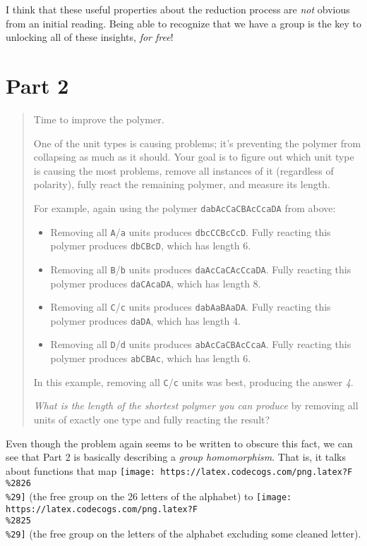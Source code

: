 \documentclass[]{article}
\begin{document}
I think that these useful properties about the reduction process are \emph{not}
obvious from an initial reading. Being able to recognize that we have a group is
the key to unlocking all of these insights, \emph{for free}!

\hypertarget{part-2}{%
\section{Part 2}\label{part-2}}

\begin{quote}
Time to improve the polymer.

One of the unit types is causing problems; it's preventing the polymer from
collapsing as much as it should. Your goal is to figure out which unit type is
causing the most problems, remove all instances of it (regardless of polarity),
fully react the remaining polymer, and measure its length.

For example, again using the polymer \texttt{dabAcCaCBAcCcaDA} from above:

\begin{itemize}
\tightlist
\item
  Removing all \texttt{A}/\texttt{a} units produces \texttt{dbcCCBcCcD}. Fully
  reacting this polymer produces \texttt{dbCBcD}, which has length 6.
\item
  Removing all \texttt{B}/\texttt{b} units produces \texttt{daAcCaCAcCcaDA}.
  Fully reacting this polymer produces \texttt{daCAcaDA}, which has length 8.
\item
  Removing all \texttt{C}/\texttt{c} units produces \texttt{dabAaBAaDA}. Fully
  reacting this polymer produces \texttt{daDA}, which has length 4.
\item
  Removing all \texttt{D}/\texttt{d} units produces \texttt{abAcCaCBAcCcaA}.
  Fully reacting this polymer produces \texttt{abCBAc}, which has length 6.
\end{itemize}

In this example, removing all \texttt{C}/\texttt{c} units was best, producing
the answer \emph{4}.

\emph{What is the length of the shortest polymer you can produce} by removing
all units of exactly one type and fully reacting the result?
\end{quote}

Even though the problem again seems to be written to obscure this fact, we can
see that Part 2 is basically describing a \emph{group homomorphism}. That is, it
talks about functions that map
\texttt{[image: https://latex.codecogs.com/png.latex?F\\\%2826\\\%29]} (the free
group on the 26 letters of the alphabet) to
\texttt{[image: https://latex.codecogs.com/png.latex?F\\\%2825\\\%29]} (the free
group on the letters of the alphabet excluding some cleaned letter).
\end{document}
